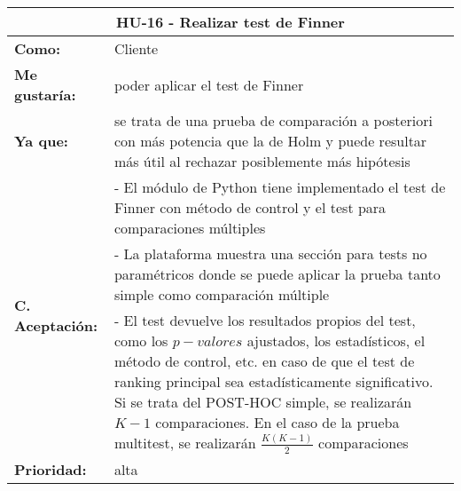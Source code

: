 \begin{table}[H]
	\begin{tabular}{| p{3cm}| p{11cm} |}
		\hline
		\multicolumn{2}{|c|}{\textbf{HU-16} - Realizar test de Finner} \\ \hline
		\textbf{Como:} & Cliente \\ \hline
		\textbf{Me gustaría:} & poder aplicar el test de Finner \\ \hline
		\textbf{Ya que:} & se trata de una prueba de comparación a posteriori con más potencia que la de Holm y puede resultar más útil al rechazar posiblemente más hipótesis \\ \hline
		\multirow{3}{11cm}{\textbf{C. Aceptación:}} & - El módulo de Python tiene implementado el test de Finner con método de control y el test para comparaciones múltiples \\
		& - La plataforma muestra una sección para tests no paramétricos donde se puede aplicar la prueba tanto simple como comparación múltiple \\
		& - El test devuelve los resultados propios del test, como los $p-valores$ ajustados, los estadísticos, el método de control, etc. en caso de que el test de ranking principal sea estadísticamente significativo. Si se trata del POST-HOC simple, se realizarán $K-1$ comparaciones. En el caso de la prueba multitest, se realizarán $\frac{K(K-1)}{2}$ comparaciones \\ \hline
		\textbf{\textbf{Prioridad:}} & alta \\ \hline
	\end{tabular}
\end{table}



